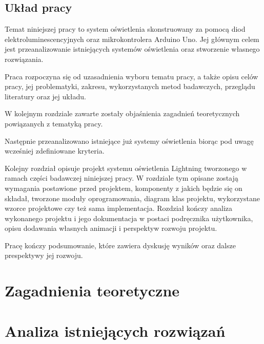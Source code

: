 \documentclass[12pt]{report}
\begin{document}
\section{Układ pracy}

Temat niniejszej pracy to system oświetlenia skonstruowany za pomocą diod elektroluminescencyjnych oraz mikrokontrolera Arduino Uno. Jej głównym celem jest przeanalizowanie istniejących systemów oświetlenia oraz stworzenie własnego ro\-związania.

Praca rozpoczyna się od uzasadnienia wyboru tematu pracy, a także opisu celów pracy, jej problematyki, zakresu, wykorzystanych metod badawczych, przeglądu literatury oraz jej układu.

W kolejnym rozdziale zawarte zostały objaśnienia zagadnień teoretycznych po\-wiązanych z tematyką pracy.

Następnie przeanalizowano istniejące już systemy oświetlenia biorąc pod uwagę wcześniej zdefiniowane kryteria.

Kolejny rozdział opisuje projekt systemu oświetlenia Lightning tworzonego w ramach części badawczej niniejszej pracy. W rozdziale tym opisane zostają wymagania postawione przed projektem, komponenty z jakich będzie się on składał, tworzone moduły oprogramowania, diagram klas projektu, wykorzystane wzorce projektowe czy też sama implementacja. Rozdział kończy analiza wykonanego projektu i jego dokumentacja w postaci podręcznika użytkownika, opisu dodawania własnych animacji i perspektyw rozwoju projektu.

Pracę kończy podsumowanie, które zawiera dyskusję wyników oraz dalsze prespektywy jej rozwoju.

\chapter[Zagadnienia teoretyczne]{Zagadnienia teoretyczne}













\chapter[Analiza istniejących rozwiązań]{Analiza istniejących rozwiązań}
\end{document}
